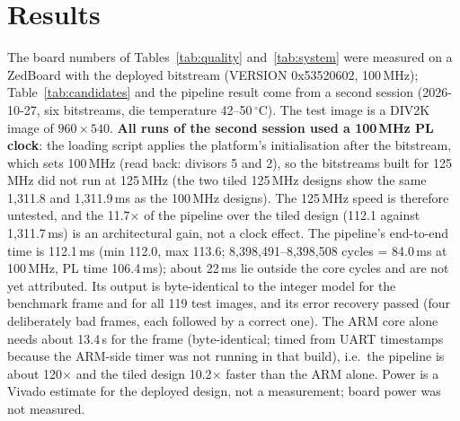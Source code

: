 \documentclass[conference]{IEEEtran}
\begin{document}
\section{Results}\label{sec:results}
The board numbers of Tables~\ref{tab:quality} and~\ref{tab:system} were measured on a ZedBoard with the deployed bitstream (VERSION 0x53520602, 100\,MHz); Table~\ref{tab:candidates} and the pipeline result come from a second session (2026-10-27, six bitstreams, die temperature 42--50\,$^\circ$C). The test image is a DIV2K image of $960\times540$.
\textbf{All runs of the second session used a 100\,MHz PL clock}: the loading script applies the platform's initialisation after the bitstream, which sets 100\,MHz (read back: divisors 5 and 2), so the bitstreams built for 125\,MHz did not run at 125\,MHz (the two tiled 125\,MHz designs show the same 1{,}311.8 and 1{,}311.9\,ms as the 100\,MHz designs). The 125\,MHz speed is therefore untested, and the 11.7$\times$ of the pipeline over the tiled design (112.1 against 1{,}311.7\,ms) is an architectural gain, not a clock effect. The pipeline's end-to-end time is 112.1\,ms (min 112.0, max 113.6; 8{,}398{,}491--8{,}398{,}508 cycles = 84.0\,ms at 100\,MHz, PL time 106.4\,ms); about 22\,ms lie outside the core cycles and are not yet attributed. Its output is byte-identical to the integer model for the benchmark frame and for all 119 test images, and its error recovery passed (four deliberately bad frames, each followed by a correct one). The ARM core alone needs about 13.4\,s for the frame (byte-identical; timed from UART timestamps because the ARM-side timer was not running in that build), i.e.\ the pipeline is about 120$\times$ and the tiled design 10.2$\times$ faster than the ARM alone.
Power is a Vivado estimate for the deployed design, not a measurement; board power was not measured.

\begin{table}[t]
\caption{Image quality, $\times2$, PSNR-Y (dB) / SSIM-Y. FPGA = outputs read back from the board, byte-identical to the INT8 integer model.}\label{tab:quality}
\centering
{}
\end{table}
\end{document}
